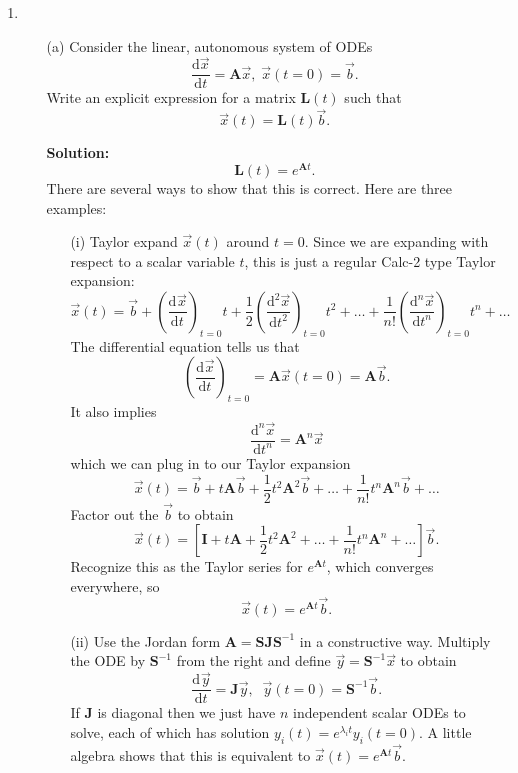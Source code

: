\documentclass[11pt,fleqn]{article}
\newcommand{\mat}[1]{\mathbf{#1}}
\newcommand{\dd}[3]{\frac{\mathrm{d}^{#3}{#1}}{\mathrm{d}{#2}^{#3}}}
\begin{document}
\begin{enumerate}
\item 
\begin{itemize}
	\item[(a)] Consider the linear, autonomous system of ODEs
\[\frac{\mathrm{d}\vec{x}}{\mathrm{d}t} = \mathbf{A}\vec{x},\;\vec{x}(t=0) = \vec{b}.\] 
	Write an explicit expression for a matrix $\mathbf{L}(t)$ such that
\[\vec{x}(t) = \mathbf{L}(t)\vec{b}.\]

     {\bf Solution:} \[\mathbf{L}(t) = e^{\mathbf{A}t}.\]
     There are several ways to show that this is correct. Here are three examples:
     \begin{itemize}
     		\item[(i)] Taylor expand $\vec{x}(t)$ around $t=0$. Since we are expanding with respect to a scalar variable $t$, this is just a regular Calc-2 type Taylor expansion:
     		\[\vec{x}(t) = \vec{b} + \left(\dd{\vec{x}}{t}{}\right)_{t=0}t + \frac{1}{2}\left(\dd{\vec{x}}{t}{2}\right)_{t=0}t^2 + \ldots + \frac{1}{n!}\left(\dd{\vec{x}}{t}{n}\right)_{t=0}t^n+\ldots\]
     		The differential equation tells us that
     		\[\left(\dd{\vec{x}}{t}{}\right)_{t=0} = \mathbf{A}\vec{x}(t=0)=\mathbf{A}\vec{b}.\]
     		It also implies
     		\[\dd{\vec{x}}{t}{n} = \mathbf{A}^n\vec{x}\]
     		which we can plug in to our Taylor expansion
     		\[\vec{x}(t) = \vec{b} + t\mathbf{A}\vec{b} + \frac{1}{2}t^2\mathbf{A}^2\vec{b} + \ldots + \frac{1}{n!}t^n\mathbf{A}^n\vec{b}+\ldots\]
     		Factor out the $\vec{b}$ to obtain
     		\[\vec{x}(t) = \left[\mathbf{I} + t\mathbf{A} + \frac{1}{2}t^2\mathbf{A}^2 + \ldots + \frac{1}{n!}t^n\mathbf{A}^n+\ldots\right]\vec{b}.\]
     		Recognize this as the Taylor series for $e^{\mathbf{A}t}$, which converges everywhere, so
     		\[\vec{x}(t) = e^{\mathbf{A}t}\vec{b}.\]
     		\item[(ii)] Use the Jordan form $\mathbf{A} = \mathbf{SJS}^{-1}$ in a constructive way. Multiply the ODE by $\mathbf{S}^{-1}$ from the right and define $\vec{y} = \mathbf{S}^{-1}\vec{x}$ to obtain
     		\[\dd{\vec{y}}{t}{} = \mat{J}\vec{y},\;\;\vec{y}(t=0) = \mat{S}^{-1}\vec{b}.\]
     		If {\bf J} is diagonal then we just have $n$ independent scalar ODEs to solve, each of which has solution $y_i(t) = e^{\lambda_it}y_i(t=0)$. A little algebra shows that this is equivalent to $\vec{x}(t) = e^{\mathbf{A}t}\vec{b}$.
     		

\end{itemize}
\end{itemize}
\end{enumerate}
\end{document}
